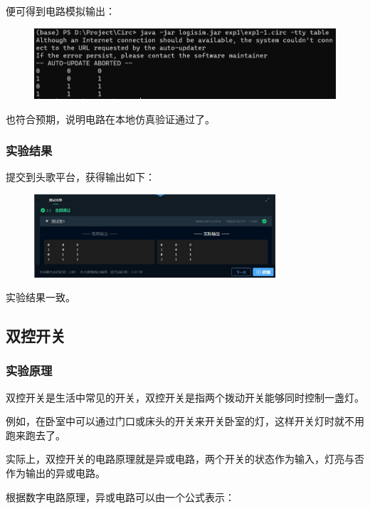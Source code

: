 \documentclass[UTF8]{ctexart}
\begin{document}
便可得到电路模拟输出：

\begin{figure}[H]
    \centering
    \includegraphics[width = \textwidth]{images/native.jpg}
\end{figure}

也符合预期，说明电路在本地仿真验证通过了。



\subsubsection{实验结果}

提交到头歌平台，获得输出如下：

\begin{figure}[H]
    \centering
    \includegraphics[width = 0.8\textwidth]{images/test.jpg}
\end{figure}

实验结果一致。


\subsection{双控开关}

\subsubsection{实验原理}

双控开关是生活中常见的开关，双控开关是指两个拨动开关能够同时控制一盏灯。

例如，在卧室中可以通过门口或床头的开关来开关卧室的灯，这样开关灯时就不用跑来跑去了。

实际上，双控开关的电路原理就是异或电路，两个开关的状态作为输入，灯亮与否作为输出的异或电路。

根据数字电路原理，异或电路可以由一个公式表示：
\end{document}
